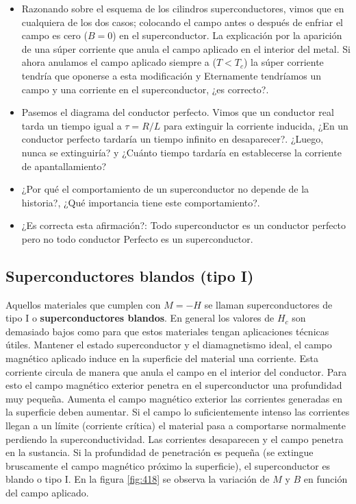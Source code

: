 \begin{itemize}
	\item Razonando sobre el esquema de los cilindros superconductores, vimos que en cualquiera de los dos casos; colocando el campo antes o después de enfriar el campo es cero ($B=0$) en el superconductor. La explicación por la aparición de una súper corriente que anula el campo aplicado en el interior del metal. Si ahora anulamos el campo aplicado siempre a ($T<T_{c}$) la súper corriente tendría que oponerse a esta modificación y Eternamente tendríamos un campo y una corriente en el superconductor, ¿es correcto?.
	
	\item Pasemos el diagrama del conductor perfecto. Vimos que un conductor real tarda un tiempo igual a $\tau=R/L$ para extinguir la corriente inducida, ¿En un conductor perfecto tardaría un tiempo infinito en desaparecer?. ¿Luego, nunca se extinguiría? y ¿Cuánto tiempo tardaría en establecerse la corriente de apantallamiento?
	
	\item ¿Por qué el comportamiento de un superconductor no depende de la historia?, ¿Qué importancia tiene este comportamiento?.
	
	\item ¿Es correcta esta afirmación?: Todo superconductor es un conductor perfecto pero no todo conductor Perfecto es un superconductor.
	
\end{itemize}

\subsection{Superconductores blandos (tipo I)}

Aquellos materiales que cumplen con $M=-H$ se llaman superconductores de tipo I o \textbf{superconductores blandos}. En general los valores de $H_{c}$ son demasiado bajos como para que estos materiales tengan aplicaciones técnicas útiles. Mantener el estado superconductor y el diamagnetismo ideal, el campo magnético aplicado induce en la superficie del material una corriente. Esta corriente circula de manera que anula el campo en el interior del conductor. Para esto el campo magnético exterior penetra en el superconductor una profundidad muy pequeña. Aumenta el campo magnético exterior las corrientes generadas en la superficie deben aumentar. Si el campo lo suficientemente intenso las corrientes llegan a un límite (corriente crítica) el material pasa a comportarse normalmente perdiendo la superconductividad. Las corrientes desaparecen y el campo penetra en la sustancia. Si la profundidad de penetración es pequeña (se extingue bruscamente el campo magnético próximo la superficie), el superconductor es blando o tipo I. En la figura \ref{fig:418} se observa la variación de $M$ y $B$ en función del campo aplicado.

